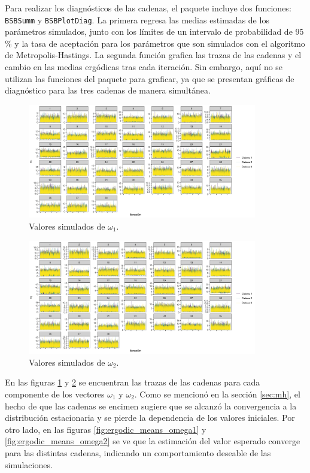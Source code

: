 \documentclass[11pt,a4paper]{article}
\begin{document}
Para realizar los diagnósticos de las cadenas, el paquete incluye dos funciones: \texttt{BSBSumm} y \texttt{BSBPlotDiag}. La primera regresa las medias estimadas de los parámetros simulados, junto con los límites de un intervalo de probabilidad de 95 \% y la tasa de aceptación para los parámetros que son simulados con el algoritmo de Metropolis-Hastings. La segunda función grafica las trazas de las cadenas y el cambio en las medias ergódicas tras cada iteración. Sin embargo, aquí no se utilizan las funciones del paquete para graficar, ya que se presentan gráficas de diagnóstico para las tres cadenas de manera simultánea.

\begin{figure}[!htb]
\centering\includegraphics[width=10cm]{traceplots_omega1.png}
\caption{Valores simulados de $\omega_1$.}
\label{fig:traceplot_omega1}
\end{figure}

\begin{figure}[!htb]
\centering\includegraphics[width=10cm]{traceplots_omega2.png}
\caption{Valores simulados de $\omega_2$.}
\label{fig:traceplot_omega2}
\end{figure}

En las figuras \ref{fig:traceplot_omega1} y \ref{fig:traceplot_omega2} se encuentran las trazas de las cadenas para cada componente de los vectores $\omega_1$ y $\omega_2$. Como se mencionó en la sección \ref{sec:mh}, el hecho de que las cadenas se encimen sugiere que se alcanzó la convergencia a la distribución estacionaria y se pierde la dependencia de los valores iniciales. Por otro lado, en las figuras \ref{fig:ergodic_means_omega1} y \ref{fig:ergodic_means_omega2} se ve que la estimación del valor esperado converge para las distintas cadenas, indicando un comportamiento deseable de las simulaciones.
\end{document}
